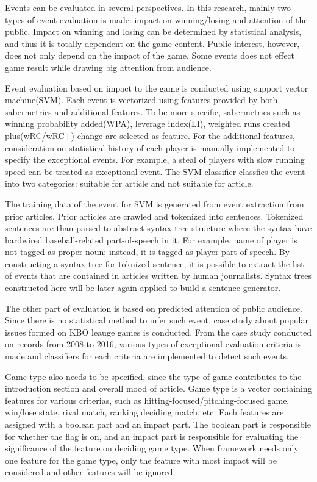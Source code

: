 \documentclass{sig-alternate}
\begin{document}
Events can be evaluated in several perspectives. In this research, mainly two types of event evaluation is made: impact on winning/losing and attention of the public. Impact on winning and losing can be determined by statistical analysis, and thus it is totally dependent on the game content. Public interest, however, does not only depend on the impact of the game. Some events does not effect game result while drawing big attention from audience. 

Event evaluation based on impact to the game is conducted using support vector machine(SVM). Each event is vectorized using features provided by both sabermetrics and additional features. To be more specific, sabermetrics such as winning probability added(WPA), leverage index(LI), weighted runs created plus(wRC/wRC+) change are selected as feature. For the additional features, consideration on statistical history of each player is manually implemented to specify the exceptional events. For example, a steal of players with slow running speed can be treated as exceptional event. The SVM classifier classfies the event into two categories: suitable for article and not suitable for article. 

The training data of the event for SVM is generated from event extraction from prior articles. Prior articles are crawled and tokenized into sentences. Tokenized sentences are than parsed to abstract syntax tree structure where the syntax have hardwired baseball-related part-of-speech in it. For example, name of player is not tagged as proper noun; instead, it is tagged as player part-of-speech. By constructing a syntax tree for toknized sentence, it is possible to extract the list of events that are contained in articles written by human journalists. Syntax trees constructed here will be later again applied to build a sentence generator. 

The other part of evaluation is based on predicted attention of public audience. Since there is no statistical method to infer such event, case study about popular issues formed on KBO leauge games is conducted. From the case study conducted on records from 2008 to 2016, various types of exceptional evaluation criteria is made and classifiers for each criteria are implemented to detect such events.

Game type also needs to be specified, since the type of game contributes to the introduction section and overall mood of article. Game type is a vector containing features for various criterias, such as hitting-focused/pitching-focused game, win/lose state, rival match, ranking deciding match, etc. Each features are assigned with a boolean part and an impact part. The boolean part is responsible for whether the flag is on, and an impact part is responsible for evaluating the significance of the feature on deciding game type. When framework needs only one feature for the game type, only the feature with most impact will be considered and other features will be ignored.
\end{document}
